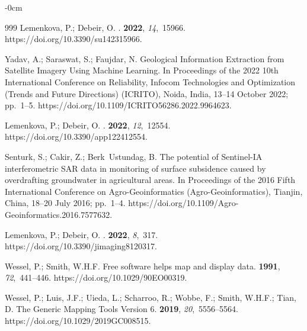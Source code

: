 \documentclass[minerals,article,accept,pdftex,moreauthors]{Definitions/mdpi}
\begin{document}
\begin{adjustwidth}{-\extralength}{0cm}
\begin{thebibliography}{999}
Lemenkova, P.; Debeir, O.
.
 {\bf 2022}, {\em 14},~15966.
\newblock https://doi.org/10.3390/su142315966.

Yadav, A.; Saraswat, S.; Faujdar, N.
\newblock Geological Information Extraction from Satellite Imagery Using
  Machine Learning.
\newblock In Proceedings of the 2022 10th International Conference on
  Reliability, Infocom Technologies and Optimization (Trends and Future
  Directions) (ICRITO), Noida, India, 13--14 October 2022; pp.~1--5. %
\newblock https://doi.org/10.1109/ICRITO56286.2022.9964623.

Lemenkova, P.; Debeir, O.
.
 {\bf 2022}, {\em 12},~12554.
\newblock https://doi.org/10.3390/app122412554.

Senturk, S.; Cakir, Z.; Berk~Ustundag, B.
\newblock The potential of Sentinel-IA interferometric SAR data in monitoring
  of surface subsidence caused by overdrafting groundwater in agricultural
  areas.
\newblock In Proceedings of the 2016 Fifth International Conference on
  Agro-Geoinformatics (Agro-Geoinformatics), Tianjin, China, 18--20 July 2016; pp.~1--4. %
\newblock https://doi.org/10.1109/Agro-Geoinformatics.2016.7577632.

Lemenkova, P.; Debeir, O.
.
 {\bf 2022}, {\em 8},~317.
\newblock https://doi.org/10.3390/jimaging8120317.

Wessel, P.; Smith, W.H.F.
\newblock Free software helps map and display data.
 {\bf 1991}, {\em
  72},~441--446.
\newblock https://doi.org/10.1029/90EO00319.

Wessel, P.; Luis, J.F.; Uieda, L.; Scharroo, R.; Wobbe, F.; Smith, W.H.F.;
  Tian, D.
\newblock The Generic Mapping Tools Version 6.
 {\bf 2019}, {\em
  20},~5556--5564.
\newblock https://doi.org/10.1029/2019GC008515.


\end{thebibliography}
\end{adjustwidth}
\end{document}
